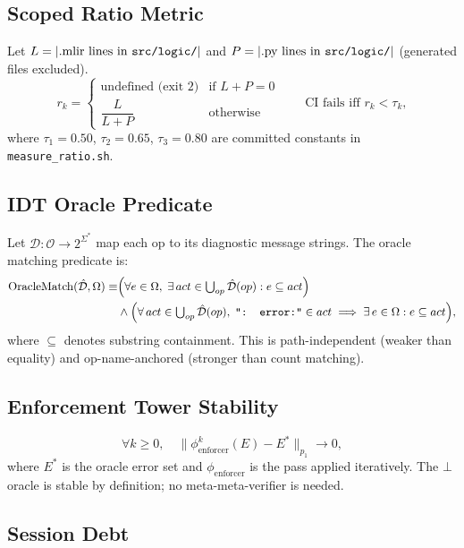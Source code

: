\documentclass[11pt,letterpaper]{article}
\theoremstyle{pirtmthm}
\theoremstyle{remark}
\begin{document}
\subsection{Scoped Ratio Metric}

Let $L = |\text{.mlir lines in \texttt{src/logic/}}|$ and
$P = |\text{.py lines in \texttt{src/logic/}}|$ (generated files excluded).
\[
  r_k =
  \begin{cases}
    \text{undefined (exit 2)} & \text{if } L + P = 0\\[4pt]
    \dfrac{L}{L + P} & \text{otherwise}
  \end{cases}
  \qquad \text{CI fails iff } r_k < \tau_k,
\]
where $\tau_1 = 0.50$, $\tau_2 = 0.65$, $\tau_3 = 0.80$
are committed constants in \texttt{measure\_ratio.sh}.

\subsection{IDT Oracle Predicate}

Let $\mathcal{D} : \mathcal{O} \to 2^{\Sigma^*}$ map each op to its diagnostic
message strings.
The oracle matching predicate is:
\begin{align*}
  \mathrm{OracleMatch}(\hat{\mathcal{D}},\Omega) \equiv &
    \Bigl(\forall e\in\Omega,\;
    \exists\,act\in\textstyle\bigcup_{op}\hat{\mathcal{D}}(op):
    e \subseteq act\Bigr)\\
  &\wedge
    \Bigl(\forall\,act\in\textstyle\bigcup_{op}\hat{\mathcal{D}}(op),\;
    \texttt{": error:"}\in act \implies \exists\,e\in\Omega: e\subseteq act\Bigr),
\end{align*}
where $\subseteq$ denotes substring containment.
This is path-independent (weaker than equality) and op-name-anchored
(stronger than count matching).

\subsection{Enforcement Tower Stability}

\[
  \forall k \geq 0,\quad
  \|\phi_{\mathrm{enforcer}}^k(E) - E^*\|_{p_1} \to 0,
\]
where $E^*$ is the oracle error set and $\phi_{\mathrm{enforcer}}$ is the
pass applied iteratively.
The $\bot$ oracle is stable by definition; no meta-meta-verifier is needed.

\subsection{Session Debt}
\end{document}
